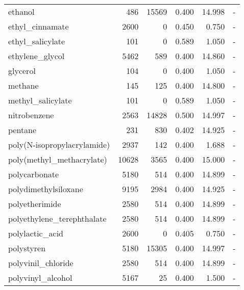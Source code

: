 \documentclass[preprint,superscriptaddress,preprintnumbers,aps,amsmath,amssymb]{revtex4}
\begin{document}
\begin{longtable}{lrrrrc}
  ethanol                        & 486       & 15569     & 0.400         & 14.998        & -        \\
  ethyl\_cinnamate               & 2600      & 0         & 0.450         & 0.750         & -        \\
  ethyl\_salicylate              & 101       & 0         & 0.589         & 1.050         & -        \\
  ethylene\_glycol               & 5462      & 589       & 0.400         & 14.860        & -        \\
  glycerol                       & 104       & 0         & 0.400         & 1.050         & -        \\
  methane                        & 145       & 125       & 0.400         & 14.800        & -        \\
  methyl\_salicylate             & 101       & 0         & 0.589         & 1.050         & -        \\
  nitrobenzene                   & 2563      & 14828     & 0.500         & 14.997        & -        \\
  pentane                        & 231       & 830       & 0.402         & 14.925        & -        \\
  poly(N-isopropylacrylamide)    & 2937      & 142       & 0.400         & 1.688         & -        \\
  poly(methyl\_methacrylate)     & 10628     & 3565      & 0.400         & 15.000        & -        \\
  polycarbonate                  & 5180      & 514       & 0.400         & 14.899        & -        \\
  polydimethylsiloxane           & 9195      & 2984      & 0.400         & 14.925        & -        \\
  polyetherimide                 & 2580      & 514       & 0.400         & 14.899        & -        \\
  polyethylene\_terephthalate    & 2580      & 514       & 0.400         & 14.899        & -        \\
  polylactic\_acid               & 2600      & 0         & 0.405         & 0.750         & -        \\
  polystyren                     & 5180      & 15305     & 0.400         & 14.997        & -        \\
  polyvinil\_chloride            & 2580      & 514       & 0.400         & 14.899        & -        \\
  polyvinyl\_alcohol             & 5167      & 25        & 0.400         & 1.500         & -        \\

\end{longtable}
\end{document}
